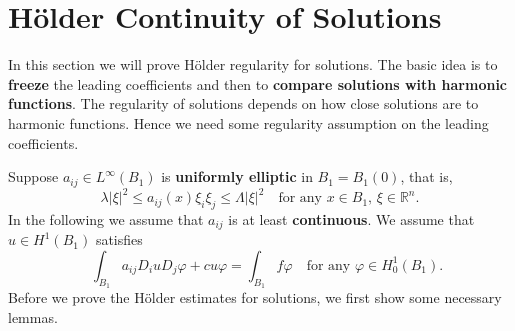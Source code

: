 \documentclass[oneside]{book}
\begin{document}
			
			\section{H\"older Continuity of Solutions}
			In this section we will prove H\"older regularity for solutions. The basic idea
			is to \textbf{freeze} the leading coefficients and then to \textbf{compare solutions with harmonic
			functions}. The regularity of solutions depends on how close solutions are to harmonic functions. Hence we need some regularity assumption on the leading coefficients.
			
			Suppose $a_{ij} \in L^\infty(B_1)$ is \textbf{uniformly elliptic} in $B_1 = B_1(0)$, that is,
			\[
			\lambda |\xi|^2 \leq a_{ij}(x) \xi_i \xi_j \leq \Lambda |\xi|^2 \quad \text{for any } x \in B_1, \, \xi \in \mathbb{R}^n.
			\]
			In the following we assume that $a_{ij}$ is at least \textbf{continuous}. We assume that $u \in H^1(B_1)$ satisfies
			\[
			\quad \int_{B_1} a_{ij} D_i u D_j \varphi + c u \varphi = \int_{B_1} f \varphi \quad \text{for any } \varphi \in H^1_0(B_1).\tag{*}
			\]
			Before we prove the H\"older estimates for solutions, we first show some necessary lemmas.
			
\end{document}
